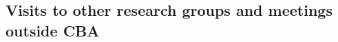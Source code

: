 \begin{enumerate}




\end{enumerate}
\subsection{Visits to other research groups and meetings outside CBA }

